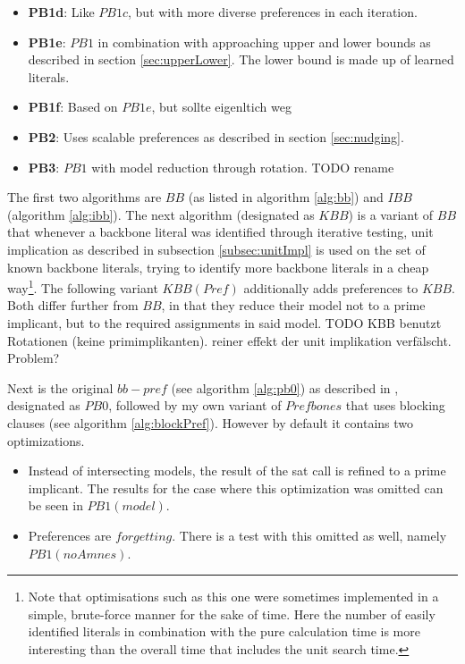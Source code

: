 \begin{itemize}
\item \textbf{PB1d}: Like $PB1c$, but with more diverse preferences in each iteration.
\item \textbf{PB1e}: $PB1$ in combination with approaching upper and lower bounds as described in section \ref{sec:upperLower}. The lower bound is made up of learned literals.
\item \textbf{PB1f}: Based on $PB1e$, but sollte eigenltich weg
\item \textbf{PB2}: Uses scalable preferences as described in section \ref{sec:nudging}.
\item \textbf{PB3}: $PB1$ with model reduction through rotation. TODO rename
\end{itemize}


\iffalse




The first two algorithms are $BB$ (as listed in algorithm \ref{alg:bb}) and $IBB$ (algorithm \ref{alg:ibb}). The next algorithm (designated as $KBB$) is a variant of $BB$ that whenever a backbone literal was identified through iterative testing, unit implication as described in subsection \ref{subsec:unitImpl} is used on the set of known backbone literals, trying to identify more backbone literals in a cheap way\footnote{
	Note that optimisations such as this one were sometimes implemented in a simple, brute-force manner for the sake of time. Here the number of easily identified literals in combination with the pure calculation time is more interesting than the overall time that includes the unit search time.
}. 
The following variant $KBB(Pref)$ additionally adds preferences to $KBB$. Both differ further from $BB$, in that they reduce their model not to a prime implicant, but to the required assignments in said model.
TODO KBB benutzt Rotationen (keine primimplikanten). reiner effekt der unit implikation verfälscht. Problem?

Next is the original $bb-pref$ (see algorithm \ref{alg:pb0}) as described in \cite{PJ18}, designated as $PB0$, followed by my own variant of $Prefbones$ that uses blocking clauses (see algorithm \ref{alg:blockPref}). However by default it contains two optimizations.
\begin{itemize}
\item Instead of intersecting models, the result of the sat call is refined to a prime implicant. The results for the case where this optimization was omitted can be seen in $PB1(model)$.
\item Preferences are $forgetting$. There is a test with this omitted as well, namely $PB1(noAmnes)$.
\end{itemize}


